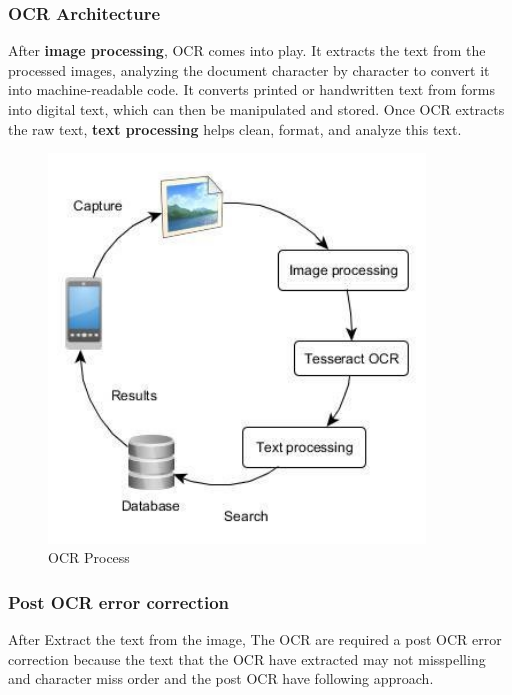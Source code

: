 \documentclass[12pt,oneside,openright,a4paper]{cpe-english-project}
\begin{document}
\subsubsection{OCR Architecture} After \textbf{image processing}, OCR comes into play. It extracts the text from the processed images, analyzing the document character by character to convert it into machine-readable code. It converts printed or handwritten text from forms into digital text, which can then be manipulated and stored. Once OCR extracts the raw text, \textbf{text processing} helps clean, format, and analyze this text.

\begin{figure}[H]
\centering
\includegraphics[width=10cm]{./assets/OCR-Process.png}
\caption{OCR Process}\label{fig:figure-2.2}
\end{figure}

\subsubsection{Post OCR error correction} After Extract the text from the image, The OCR are required a post OCR error correction because the text that the OCR have extracted may not misspelling and character miss order and the post OCR have following approach.
\end{document}
